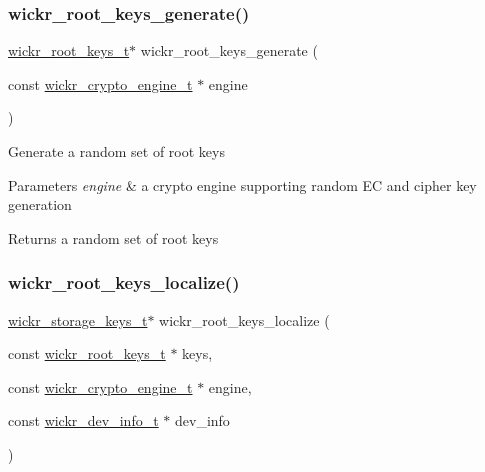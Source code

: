 \subsubsection{\texorpdfstring{wickr\+\_\+root\+\_\+keys\+\_\+generate()}{wickr\_root\_keys\_generate()}}
{\footnotesize\ttfamily \hyperlink{structwickr__root__keys}{wickr\+\_\+root\+\_\+keys\+\_\+t}$\ast$ wickr\+\_\+root\+\_\+keys\+\_\+generate (\begin{DoxyParamCaption}\item[{const \hyperlink{structwickr__crypto__engine}{wickr\+\_\+crypto\+\_\+engine\+\_\+t} $\ast$}]{engine }\end{DoxyParamCaption})}

Generate a random set of root keys


\begin{DoxyParams}{Parameters}
{\em engine} & a crypto engine supporting random EC and cipher key generation \\
\hline
\end{DoxyParams}
\begin{DoxyReturn}{Returns}
a random set of root keys 
\end{DoxyReturn}
\mbox{\label{group__wickr__root__keys_gaa34dd6c85c667b8b7fb025f56c7bcc46}} 
\subsubsection{\texorpdfstring{wickr\+\_\+root\+\_\+keys\+\_\+localize()}{wickr\_root\_keys\_localize()}}
{\footnotesize\ttfamily \hyperlink{structwickr__storage__keys}{wickr\+\_\+storage\+\_\+keys\+\_\+t}$\ast$ wickr\+\_\+root\+\_\+keys\+\_\+localize (\begin{DoxyParamCaption}\item[{const \hyperlink{structwickr__root__keys}{wickr\+\_\+root\+\_\+keys\+\_\+t} $\ast$}]{keys,  }\item[{const \hyperlink{structwickr__crypto__engine}{wickr\+\_\+crypto\+\_\+engine\+\_\+t} $\ast$}]{engine,  }\item[{const \hyperlink{structwickr__dev__info}{wickr\+\_\+dev\+\_\+info\+\_\+t} $\ast$}]{dev\+\_\+info }\end{DoxyParamCaption})}

